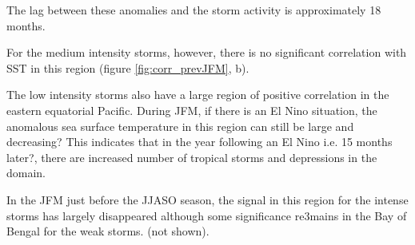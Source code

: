 The lag between these anomalies and the storm activity is approximately 18 months.

For the medium intensity storms, however, there is no significant correlation with SST in this region (figure \ref{fig:corr_prevJFM}, b). %

The low intensity storms also have a large region of positive correlation in the eastern equatorial Pacific. During JFM, if there is an El Nino situation, the anomalous sea surface temperature in this region can still be large and decreasing? This indicates that in the year following an El Nino i.e. 15 months later?, there are increased number of tropical storms and depressions in the domain.



In the JFM just before the JJASO season, the signal in this region for the intense storms has largely disappeared although some significance re3mains in the Bay of Bengal for the weak storms. (not shown).

%	


